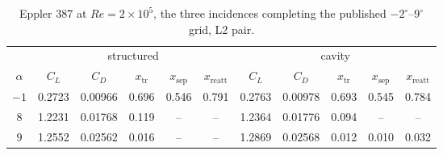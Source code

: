 \begin{table}[H]
  \centering\small
  \caption{Eppler 387 at $Re=2\times10^5$, the three incidences completing the published $-2^\circ$--$9^\circ$ grid, L2 pair.}
  \label{t:exteppa200k}
  \begin{tabular}{c ccccc ccccc}
    \toprule
    & \multicolumn{5}{c}{structured} & \multicolumn{5}{c}{cavity} \\
    \cmidrule(lr){2-6}\cmidrule(lr){7-11}
    $\alpha$ & $C_L$ & $C_D$ & $x_\mathrm{tr}$ & $x_\mathrm{sep}$ & $x_\mathrm{reatt}$
             & $C_L$ & $C_D$ & $x_\mathrm{tr}$ & $x_\mathrm{sep}$ & $x_\mathrm{reatt}$ \\
    \midrule
    $-1$ & 0.2723 & 0.00966 & 0.696 & 0.546 & 0.791 & 0.2763 & 0.00978 & 0.693 & 0.545 & 0.784 \\
    $8$ & 1.2231 & 0.01768 & 0.119 & -- & -- & 1.2364 & 0.01776 & 0.094 & -- & -- \\
    $9$ & 1.2552 & 0.02562 & 0.016 & -- & -- & 1.2869 & 0.02568 & 0.012 & 0.010 & 0.032 \\
    \bottomrule
  \end{tabular}
\end{table}
